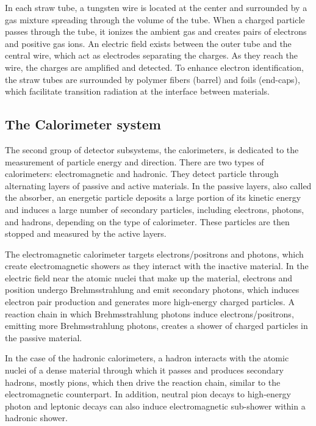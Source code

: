 In each straw tube, a tungsten wire is located at the center and surrounded by a gas mixture spreading through the volume of the tube. 
When a charged particle passes through the tube, it ionizes the ambient gas and creates pairs of electrons and positive gas ions. 
An electric field exists between the outer tube and the central wire, which act as electrodes separating the charges. 
As they reach the wire, the charges are amplified and detected. 
To enhance electron identification, the straw tubes are surrounded by polymer fibers (barrel) and foils (end-caps), 
which facilitate transition radiation at the interface between materials. 

\subsection{The Calorimeter system}

The second group of detector subsystems, the calorimeters, is dedicated to the measurement of particle energy and direction. 
There are two types of calorimeters: electromagnetic and hadronic. 
They detect particle through alternating layers of passive and active materials. 
In the passive layers, also called the absorber, an energetic particle deposits a large portion of its kinetic energy and 
induces a large number of secondary particles, including electrons, photons, and hadrons, depending on the type of calorimeter. 
These particles are then stopped and measured by the active layers. 

The electromagnetic calorimeter targets electrons/positrons and photons, which create electromagnetic showers as they interact with the inactive material. 
In the electric field near the atomic nuclei that make up the material, electrons and position undergo Brehmsstrahlung 
and emit secondary photons, which induces electron pair production and generates more high-energy charged particles. 
A reaction chain in which Brehmsstrahlung photons induce electrons/positrons, emitting more Brehmsstrahlung photons, 
creates a shower of charged particles in the passive material. 

In the case of the hadronic calorimeters, a hadron interacts with the atomic nuclei of a dense material through which it 
passes and produces secondary hadrons, mostly pions, which then drive the reaction chain, similar to the electromagnetic counterpart. 
In addition, neutral pion decays to high-energy photon and leptonic decays can also induce electromagnetic sub-shower within a hadronic shower. 

